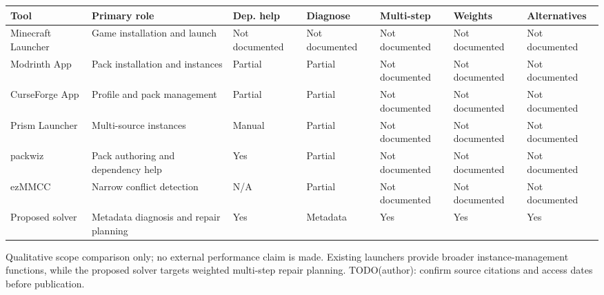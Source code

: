 \begin{tabularx}{\linewidth}{@{}lXlllll@{}}
\hline
Tool & Primary role & Dep. help & Diagnose & Multi-step & Weights & Alternatives \\
\hline
Minecraft Launcher & Game installation and launch & Not documented & Not documented & Not documented & Not documented & Not documented \\
Modrinth App & Pack installation and instances & Partial & Partial & Not documented & Not documented & Not documented \\
CurseForge App & Profile and pack management & Partial & Partial & Not documented & Not documented & Not documented \\
Prism Launcher & Multi-source instances & Manual & Partial & Not documented & Not documented & Not documented \\
packwiz & Pack authoring and dependency help & Yes & Partial & Not documented & Not documented & Not documented \\
ezMMCC & Narrow conflict detection & N/A & Partial & Not documented & Not documented & Not documented \\
Proposed solver & Metadata diagnosis and repair planning & Yes & Metadata & Yes & Yes & Yes \\
\hline
\end{tabularx}
\par\footnotesize Qualitative scope comparison only; no external performance claim is made. Existing launchers provide broader instance-management functions, while the proposed solver targets weighted multi-step repair planning. TODO(author): confirm source citations and access dates before publication.
